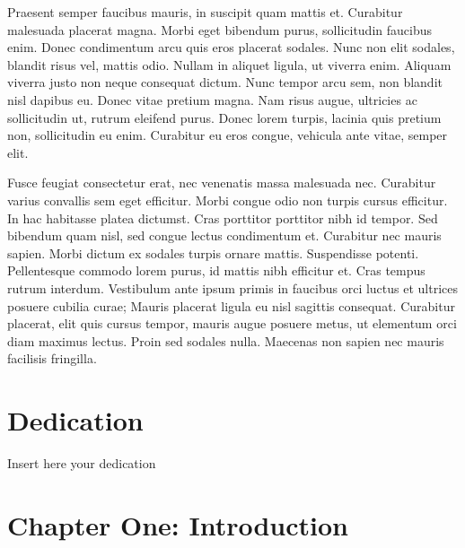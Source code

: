 \documentclass[]{article}
\numberwithin{equation}{section}
\begin{document}
Praesent semper faucibus mauris, in suscipit quam mattis et. Curabitur malesuada placerat magna. Morbi eget bibendum purus, sollicitudin faucibus enim. Donec condimentum arcu quis eros placerat sodales. Nunc non elit sodales, blandit risus vel, mattis odio. Nullam in aliquet ligula, ut viverra enim. Aliquam viverra justo non neque consequat dictum. Nunc tempor arcu sem, non blandit nisl dapibus eu. Donec vitae pretium magna. Nam risus augue, ultricies ac sollicitudin ut, rutrum eleifend purus. Donec lorem turpis, lacinia quis pretium non, sollicitudin eu enim. Curabitur eu eros congue, vehicula ante vitae, semper elit.

Fusce feugiat consectetur erat, nec venenatis massa malesuada nec. Curabitur varius convallis sem eget efficitur. Morbi congue odio non turpis cursus efficitur. In hac habitasse platea dictumst. Cras porttitor porttitor nibh id tempor. Sed bibendum quam nisl, sed congue lectus condimentum et. Curabitur nec mauris sapien. Morbi dictum ex sodales turpis ornare mattis. Suspendisse potenti. Pellentesque commodo lorem purus, id mattis nibh efficitur et. Cras tempus rutrum interdum. Vestibulum ante ipsum primis in faucibus orci luctus et ultrices posuere cubilia curae; Mauris placerat ligula eu nisl sagittis consequat. Curabitur placerat, elit quis cursus tempor, mauris augue posuere metus, ut elementum orci diam maximus lectus. Proin sed sodales nulla. Maecenas non sapien nec mauris facilisis fringilla.

\clearpage

\section*{Dedication}

\begin{center}
    \vspace*{\fill}
    Insert here your dedication
    \vspace*{\fill}
\end{center}

\clearpage

\hypertarget{chapter-one-introduction}{%
\section{Chapter One: Introduction}\label{chapter-one-introduction}}


\renewcommand{\thefigure}{1.\arabic{figure}}
\setcounter{figure}{0}
\renewcommand{\thetable}{1.\arabic{table}}
\setcounter{table}{0}
\renewcommand{\theequation}{1.\arabic{equation}}
\setcounter{equation}{0}
\end{document}
